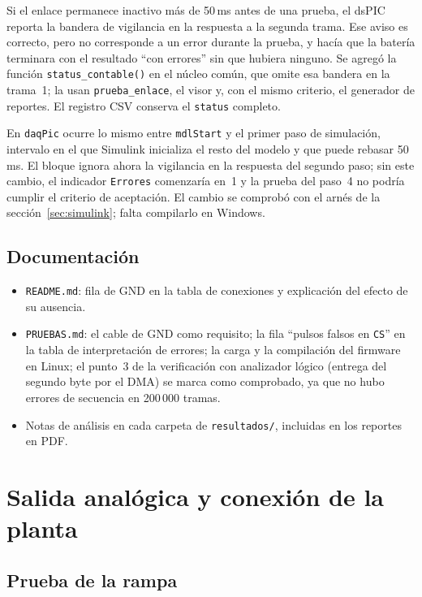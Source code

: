 \documentclass[11pt]{article}
\newcommand{\code}[1]{\texttt{#1}}
\begin{document}
Si el enlace permanece inactivo más de 50\,ms antes de una prueba, el dsPIC
reporta la bandera de vigilancia en la respuesta a la segunda trama. Ese
aviso es correcto, pero no corresponde a un error durante la prueba, y hacía
que la batería terminara con el resultado ``con errores'' sin que hubiera
ninguno. Se agregó la función \code{status\_contable()} en el núcleo común,
que omite esa bandera en la trama~1; la usan \code{prueba\_enlace}, el visor
y, con el mismo criterio, el generador de reportes. El registro CSV conserva
el \code{status} completo.

En \code{daqPic} ocurre lo mismo entre \code{mdlStart} y el primer paso de
simulación, intervalo en el que Simulink inicializa el resto del modelo y que
puede rebasar 50\,ms. El bloque ignora ahora la vigilancia en la respuesta del
segundo paso; sin este cambio, el indicador \code{Errores} comenzaría en~1 y
la prueba del paso~4 no podría cumplir el criterio de aceptación. El cambio
se comprobó con el arnés de la sección~\ref{sec:simulink}; falta compilarlo
en Windows.

\subsection{Documentación}

\begin{itemize}
\item \code{README.md}: fila de GND en la tabla de conexiones y explicación
  del efecto de su ausencia.
\item \code{PRUEBAS.md}: el cable de GND como requisito; la fila ``pulsos
  falsos en \code{CS}'' en la tabla de interpretación de errores; la carga y
  la compilación del firmware en Linux; el punto~3 de la verificación con
  analizador lógico (entrega del segundo byte por el DMA) se marca como
  comprobado, ya que no hubo errores de secuencia en 200\,000 tramas.
\item Notas de análisis en cada carpeta de \code{resultados/}, incluidas en
  los reportes en PDF.
\end{itemize}

\section{Salida analógica y conexión de la planta}

\subsection{Prueba de la rampa}
\end{document}
